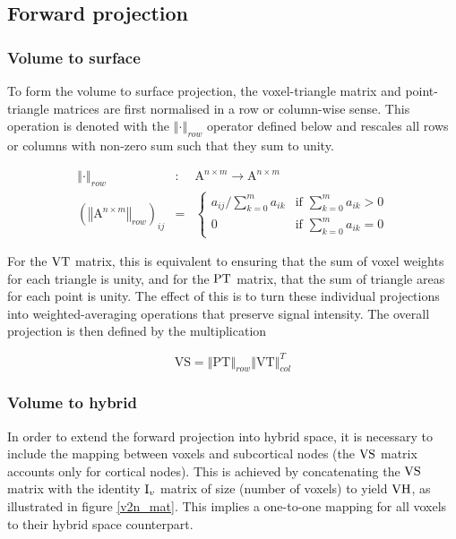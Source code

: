\subsection{Forward projection}

\subsubsection{Volume to surface}
To form the volume to surface projection, the voxel-triangle matrix and point-triangle matrices are first normalised in a row or column-wise sense. This operation is denoted with the $\left\Vert \cdot \right\Vert_{row}$ operator defined below and rescales all rows or columns with non-zero sum such that they sum to unity. 

\begin{eqnarray}
\left\Vert \cdot \right\Vert_{row} &:& \mathrm{A}^{n \times m} \rightarrow \mathrm{A}^{n \times m} \nonumber \\
(\left\Vert \mathrm{A}^{n \times m} \right\Vert_{row})_{ij} &=&
\begin{cases}
a_{ij} / \sum^m_{k=0} a_{ik} & \text{if } \sum^m_{k=0} a_{ik} > 0 \\ 
0 & \text{if } \sum^m_{k=0} a_{ik} = 0 
\end{cases}
\end{eqnarray}

For the $\mathrm{VT}$ matrix, this is equivalent to ensuring that the sum of voxel weights for each triangle is unity, and for the $\mathrm{PT}$ matrix, that the sum of triangle areas for each point is unity. The effect of this is to turn these individual projections into weighted-averaging operations that preserve signal intensity. The overall projection is then defined by the multiplication

\begin{equation}
\mathrm{VS} = \left\Vert\mathrm{PT}\right\Vert_{row} \left\Vert \mathrm{VT} \right\Vert_{col}^T
\end{equation}

\subsubsection{Volume to hybrid}

In order to extend the forward projection into hybrid space, it is necessary to include the mapping between voxels and subcortical nodes (the $\mathrm{VS}$ matrix accounts only for cortical nodes). This is achieved by concatenating the $\mathrm{VS}$ matrix with the identity $\mathrm{I}_v$ matrix of size (number of voxels) to yield $\mathrm{VH}$, as illustrated in figure \ref{v2n_mat}. This implies a one-to-one mapping for all voxels to their hybrid space counterpart. 

